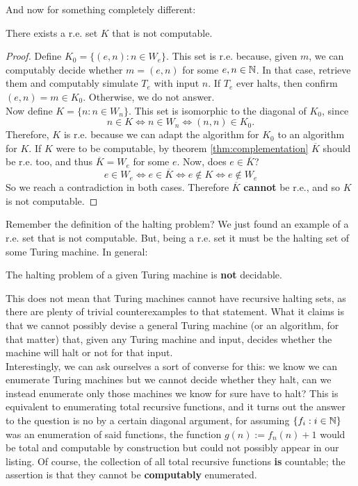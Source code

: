 \documentclass[../main.tex]{memoir}
\begin{document}
And now for something completely different:

\begin{theorem}
  \label{thm:re-not-r-set}
  There exists a r.e. set $K$ that is not computable.
\end{theorem}
\begin{proof}
  Define $K_0 = \{(e, n): n \in W_e \}$. This set is r.e. because, given $m$, we can computably decide whether $m = (e, n)$ for some $e, n \in \mathbb{N}$. In that case, retrieve them and computably simulate $T_e$ with input $n$. If $T_e$ ever halts, then confirm $(e, n) = m \in K_0$. Otherwise, we do not answer. \\
  Now define $K = \{n: n \in W_n\}$. This set is isomorphic to the diagonal of $K_0$, since
  \[ n \in K \iff n \in W_n \iff (n, n) \in K_0. \]
  Therefore, $K$ is r.e. because we can adapt the algorithm for $K_0$ to an algorithm for $K$.
  If $K$ were to be computable, by theorem \ref{thm:complementation} $\overline{K}$ should be r.e. too, and thus $\overline{K} = W_e$ for some $e$. Now, does $e \in \overline{K}$?
  \[ e \in W_e \iff e \in \overline{K} \iff e \not\in K \iff e \not\in W_e \]
  So we reach a contradiction in both cases. Therefore $\overline{K}$ \textbf{cannot} be r.e., and so $K$ is not computable.
\end{proof}

Remember the definition of the halting problem? We just found an example of a r.e. set that is not computable. But, being a r.e. set it must be the halting set of some Turing machine. In general:

\begin{corollary}
  The halting problem of a given Turing machine is \textbf{not} decidable.
\end{corollary}

This does not mean that Turing machines cannot have recursive halting sets, as there are plenty of trivial counterexamples to that statement. What it claims is that we cannot possibly devise a general Turing machine (or an algorithm, for that matter) that, given any Turing machine and input, decides whether the machine will halt or not for that input. \\

Interestingly, we can ask ourselves a sort of converse for this: we know we can enumerate Turing machines but we cannot decide whether they halt, can we instead enumerate only those machines we know for sure have to halt? This is equivalent to enumerating total recursive functions, and it turns out the answer to the question is no by a certain diagonal argument, for assuming $\{f_i: i \in \mathbb{N}\}$ was an enumeration of said functions, the function $g(n) := f_n(n) + 1$ would be total and computable by construction but could not possibly appear in our listing. Of course, the collection of all total recursive functions \textbf{is} countable; the assertion is that they cannot be \textbf{computably} enumerated.
\end{document}
